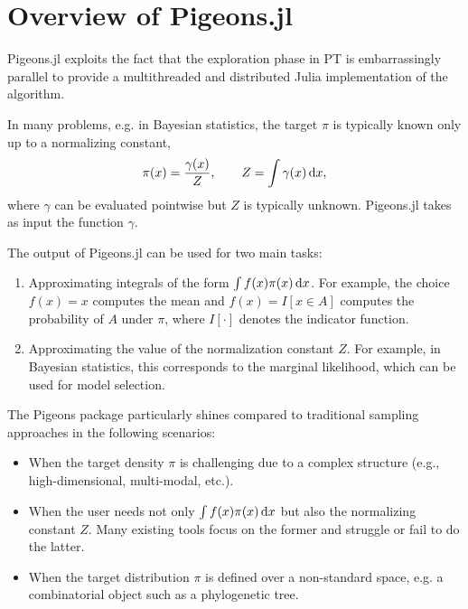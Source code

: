 \section{Overview of Pigeons.jl}\label{sec:overview}

Pigeons.jl exploits the fact that the exploration phase in PT is embarrassingly parallel
to provide a multithreaded and distributed Julia implementation of the algorithm.

In many problems, e.g. in Bayesian 
statistics, the target $\pi$ is typically known only up to a normalizing constant, 
\[
\label{eq:normalizing_constant}
  \pi(x) = \frac{\gamma(x)}{Z}, \qquad Z = \int \gamma(x) \, \dee x,
\]  
where $\gamma$ can be evaluated pointwise but $Z$ is typically unknown.
Pigeons.jl takes as input the function $\gamma$.


The output of Pigeons.jl can be used for two main tasks:
\begin{enumerate}
    \item Approximating integrals of the form $\int f(x) \pi(x) \, \mathrm{d} x$.  
    For example, the choice $f(x) = x$ computes the mean and 
    $f(x) = I[x \in A]$ computes the probability of $A$ under $\pi$,
    where $I[\cdot]$ denotes the indicator function.

    \item Approximating the value of the normalization constant $Z$. For 
    example, in Bayesian statistics, this corresponds to the 
    marginal likelihood, which can be used for model selection. 
\end{enumerate}
The Pigeons package particularly shines compared to traditional sampling approaches in the 
following scenarios:
\begin{itemize}
    \item When the target density $\pi$ is challenging due to a complex structure 
    (e.g., high-dimensional, multi-modal, etc.).
    
    \item When the user needs not only $\int f(x) \pi(x) \, \mathrm{d} x$ but also
    the normalizing constant $Z$. 
    Many existing tools focus on the former and struggle or fail to do the latter. 
    
    \item When the target distribution $\pi$ is defined over a non-standard space, 
    e.g. a combinatorial object such as a phylogenetic tree.  
\end{itemize}
